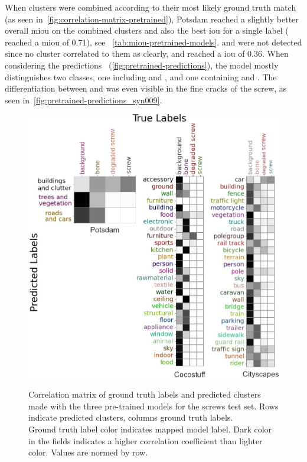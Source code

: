When clusters were combined according to their most likely ground truth match (as seen in~\autoref{fig:correlation-matrix-pretrained}), Potsdam reached a slightly better overall \gls{miou} on the combined clusters and also the best \gls{iou} for a single label ( reached a \gls{miou} of 0.71), see ~\autoref{tab:miou-pretrained-models}.
 and  were not detected since no cluster correlated to them as clearly, and  reached a \gls{iou} of 0.36.
When considering the predictions ~(\autoref{fig:pretrained-predictions}), the model mostly distinguishes two classes, one including  and , and one containing  and .
The differentiation between  and  was even visible in the fine cracks of the screw, as seen in~\autoref{fig:pretrained-predictions_syn009}.

\begin{figure}[!htb]
    \centering
    \includegraphics[width=\textwidth]{pictures/experiment_1/all_raw-cleaned_correlation_matrices}\\
    \caption[Correlation of Predicted Clusters to Labels]{Correlation matrix of ground truth labels and predicted clusters made with the three pre-trained models for the screws test set. Rows indicate predicted clusters, columns ground truth labels. \\ Ground truth label color indicates mapped model label. Dark color in the fields indicates a higher correlation coefficient than lighter color. Values are normed by row.}
    \label{fig:correlation-matrix-pretrained}
\end{figure}

